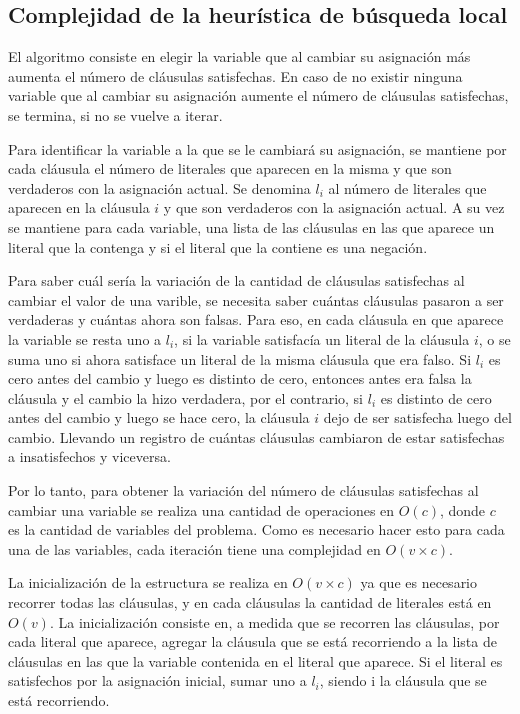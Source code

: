 \documentclass[a4paper,10pt]{article}
\begin{document}
\subsection*{Complejidad de la heur\'istica de b\'usqueda local}

El algoritmo consiste en elegir la variable que al cambiar su asignación más aumenta el número de cl\'ausulas satisfechas. En caso de no existir ninguna variable que al cambiar su asignación aumente el número de cláusulas satisfechas, se termina, si no se vuelve a iterar.

Para identificar la variable a la que se le cambiará su asignación, se mantiene por cada cláusula el número de literales que aparecen en la misma y que son verdaderos con la asignación actual. Se denomina $l_i$ al número de literales que aparecen en la cláusula $i$ y que son verdaderos con la asignación actual. A su vez se mantiene para cada variable, una lista de las cláusulas en las que aparece un literal que la contenga y si el literal que la contiene es una negación. 

Para saber cuál sería la variación de la cantidad de cláusulas satisfechas al cambiar el valor de una varible, se necesita saber cuántas cláusulas pasaron a ser verdaderas y cuántas ahora son falsas. Para eso, en cada cláusula en que aparece la variable se resta uno a $l_i$, si la variable satisfacía un literal de la cláusula $i$, o se suma uno si ahora satisface un literal de la misma cláusula que era falso. Si $l_i$ es cero antes del cambio y luego es distinto de cero, entonces antes era falsa la cláusula y el cambio la hizo verdadera, por el contrario, si $l_i$ es distinto de cero antes del cambio y luego se hace cero, la cláusula $i$ dejo de ser satisfecha luego del cambio. Llevando un registro de cuántas cláusulas cambiaron de estar satisfechas a insatisfechos y viceversa. 


Por lo tanto, para obtener la variación del número de cláusulas satisfechas al cambiar una variable se realiza una cantidad de operaciones en $O\left( c \right)$, donde $c$ es la cantidad de variables del problema. Como es necesario hacer esto para cada una de las variables, cada iteración tiene una complejidad en $O\left( v \times c  \right)$.

La inicialización de la estructura se realiza en $O\left( v \times  c\right)$ ya que es necesario recorrer todas las cl\'ausulas, y en cada cláusulas la cantidad de literales está en $O\left( v\right)$. La inicialización consiste en, a medida que se recorren las cláusulas, por cada literal que aparece, agregar la cláusula que se está recorriendo a la lista de cl\'ausulas en las que la variable contenida en el literal que aparece. Si el literal es satisfechos por la asignación inicial, sumar uno a $l_i$, siendo i la cláusula que se está recorriendo. 
\end{document}
